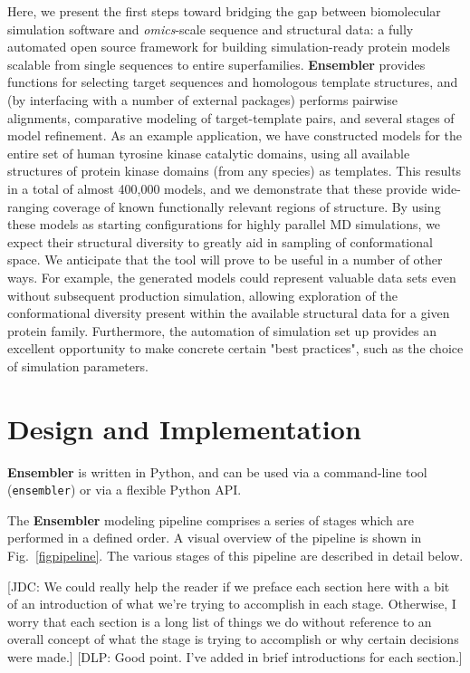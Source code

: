 \documentclass[aps,pre,twocolumn,nofootinbib,superscriptaddress,linenumbers]{revtex4-1}
\begin{document}
Here, we present the first steps toward bridging the gap between biomolecular simulation software and \emph{omics}-scale sequence and structural data: a fully automated open source framework for building simulation-ready protein models scalable from single sequences to entire superfamilies.
{\bf Ensembler} provides functions for selecting target sequences and homologous template structures, and (by interfacing with a number of external packages) performs pairwise alignments, comparative modeling of target-template pairs, and several stages of model refinement.
As an example application, we have constructed models for the entire set of human tyrosine kinase catalytic domains, using all available structures of protein kinase domains (from any species) as templates.
This results in a total of almost 400,000 models, and we demonstrate that these provide wide-ranging coverage of known functionally relevant regions of structure.
By using these models as starting configurations for highly parallel MD simulations, we expect their structural diversity to greatly aid in sampling of conformational space.
We anticipate that the tool will prove to be useful in a number of other ways.
For example, the generated models could represent valuable data sets even without subsequent production simulation, allowing exploration of the conformational diversity present within the available structural data for a given protein family.
Furthermore, the automation of simulation set up provides an excellent opportunity to make concrete certain "best practices", such as the choice of simulation parameters.

\section{Design and Implementation}

{\bf Ensembler} is written in Python, and can be used via a command-line tool ({\tt ensembler}) or via a flexible Python API.

The {\bf Ensembler} modeling pipeline comprises a series of stages which are performed in a defined order. 
A visual overview of the pipeline is shown in Fig.~\ref{figpipeline}.
The various stages of this pipeline are described in detail below.

{\color{red}[JDC: We could really help the reader if we preface each section here with a bit of an introduction of what we're trying to accomplish in each stage.  Otherwise, I worry that each section is a long list of things we do without reference to an overall concept of what the stage is trying to accomplish or why certain decisions were made.]}
{\color{blue}[DLP: Good point. I've added in brief introductions for each section.]}
\end{document}
